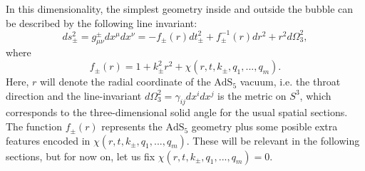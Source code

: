 \documentclass[12pt, a4paper]{article} %
\begin{document}
In this dimensionality, the simplest geometry inside and outside the bubble can be described by the following line invariant:
\begin{equation}\label{eq: basic_global_bubble}
	ds_{\pm}^{2} = g^{\pm}_{\mu\nu} dx^{\mu} dx^{\nu} =  -f_{\pm}(r) dt_{\pm}^{2} + f^{-1}_{\pm}(r) dr^{2} + r^{2} d\Omega_{3}^{2},
\end{equation}
where
\begin{equation}\label{eq: vacuum_func}
	f_{\pm}(r) = 1 + k_{\pm}^{2} r^{2} + \chi(r, t, k_{\pm}, q_{1},..., q_{m}).
\end{equation}
Here, $r$ will denote the radial coordinate of the $\text{AdS}_{5}$ vacuum, i.e. the throat direction and the line-invariant $d\Omega_{3}^{2} = \gamma_{ij}dx^{i}dx^{j}$ is the metric on $S^{3}$, which corresponds to the three-dimensional solid angle for the usual spatial sections. The function $f_{\pm}(r)$ represents the $\text{AdS}_{5}$ geometry plus some posible extra features encoded in $\chi(r, t, k_{\pm}, q_{1},..., q_{m})$. These will be relevant in the following sections, but for now on, let us fix $\chi(r, t, k_{\pm}, q_{1},..., q_{m}) =0$.
\end{document}
